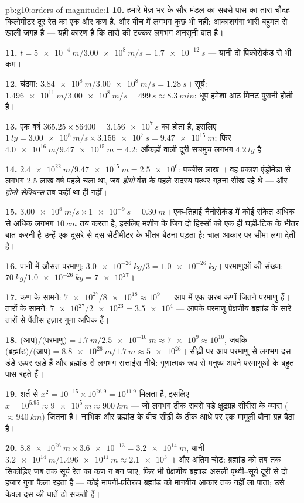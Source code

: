 \begin{solution}{pb:g10:orders-of-magnitude:1}
\textbf{10.} हमारे मेज़ भर के सौर मंडल का सबसे पास का तारा चौदह
किलोमीटर दूर रेत का एक और कण है, और बीच में लगभग कुछ भी नहीं: आकाशगंगा
भारी बहुमत से खाली जगह है --- यही कारण है कि तारों की टक्कर लगभग
अनसुनी बात है।

\textbf{11.} $t = \qty{5e-4}{m}/\qty{3.00e8}{m/s} = \qty{1.7e-12}{s}$ --- यानी दो पिकोसेकंड से भी कम।

\textbf{12.} चंद्रमा: $\qty{3.84e8}{m}/\qty{3.00e8}{m/s} =
\qty{1.28}{s}$। सूर्य: $\qty{1.496e11}{m}/\qty{3.00e8}{m/s} =
\qty{499}{s} \approx \qty{8.3}{min}$: धूप हमेशा आठ मिनट पुरानी
होती है।

\textbf{13.} एक वर्ष $365.25 \times 86400 = \qty{3.156e7}{s}$ का होता है, इसलिए $\qty{1}{ly} = \qty{3.00e8}{m/s} \times \qty{3.156e7}{s}
= \qty{9.47e15}{m}$; फिर $\qty{4.0e16}{m}/\qty{9.47e15}{m} = 4.2$:
आँकड़ों वाली दूरी सचमुच लगभग $\qty{4.2}{ly}$ है।

\textbf{14.} $\qty{2.4e22}{m}/\qty{9.47e15}{m} = \num{2.5e6}$: पच्चीस लाख । वह प्रकाश
एंड्रोमेडा से लगभग $2.5$ लाख वर्ष पहले चला था, जब \emph{होमो} वंश के
पहले सदस्य पत्थर गढ़ना सीख रहे थे --- और \emph{होमो सेपियन्स} तब कहीं
था ही नहीं।

\textbf{15.} $\qty{3.00e8}{m/s} \times \qty{1e-9}{s} = \qty{0.30}{m}$। एक-तिहाई नैनोसेकंड में कोई संकेत अधिक से अधिक
लगभग $\qty{10}{cm}$ तय करता है, इसलिए मशीन के जिन दो हिस्सों को एक ही घड़ी-टिक
के भीतर बात करनी है उन्हें एक-दूसरे से दस सेंटीमीटर के भीतर बैठना पड़ता
है: चाल आकार पर सीमा लगा देती है।

\textbf{16.} पानी में औसत परमाणु: $\qty{3.0e-26}{kg}/3 = \qty{1.0e-26}{kg}$। परमाणुओं की संख्या: $\qty{70}{kg}/\qty{1.0e-26}{kg} = \num{7e27}$।

\textbf{17.} कण के सामने: $\num{7e27}/\num{8e18} \approx 10^{9}$ --- आप में एक अरब कणों जितने परमाणु
हैं। तारों के सामने: $\num{7e27}/\num{2e23} = \num{3.5e4}$ --- आपके परमाणु प्रेक्षणीय ब्रह्मांड के
सारे तारों से पैंतीस हज़ार गुना अधिक हैं।

\textbf{18.} $\text{(आप)}/\text{(परमाणु)} =
\qty{1.7}{m}/\qty{2.5e-10}{m} \approx \num{7e9} \approx 10^{10}$, जबकि $\text{(ब्रह्मांड)}/\text{(आप)} =
\qty{8.8e26}{m}/\qty{1.7}{m} \approx \num{5e26}$। सीढ़ी पर आप परमाणु से लगभग दस डंडे
ऊपर खड़े हैं और ब्रह्मांड से लगभग सत्ताईस नीचे: गुणात्मक रूप से मनुष्य
अपने परमाणुओं के बहुत पास रहते हैं।

\textbf{19.} शर्त से $x^{2} = 10^{-15} \times 10^{26.9} = 10^{11.9}$ मिलता है, इसलिए $x = 10^{5.95} \approx \qty{9e5}{m} \approx \qty{900}{km}$ --- जो लगभग ठीक
सबसे बड़े क्षुद्रग्रह सीरीस के व्यास ($\approx \qty{940}{km}$) जितना है। नाभिक और
ब्रह्मांड के बीच सीढ़ी के ठीक आधे पर एक मामूली बौना ग्रह बैठा है।

\textbf{20.} $\qty{8.8e26}{m} \times \num{3.6e-13} = \qty{3.2e14}{m}$, यानी $\qty{3.2e14}{m}/\qty{1.496e11}{m} \approx \num{2.1e3}$ । और अंतिम चोट:
ब्रह्मांड को तब तक सिकोड़िए जब तक सूर्य रेत का कण न बन जाए, फिर भी
प्रेक्षणीय ब्रह्मांड असली पृथ्वी--सूर्य दूरी से दो हज़ार गुना फैला रहता
है --- कोई मापनी-प्रतिरूप ब्रह्मांड को मानवीय आकार तक नहीं ला पाता;
उसे केवल दस की घातें ढो सकती हैं।
\end{solution}
